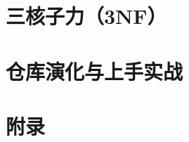 \documentclass[11pt, a4paper, oneside, openany]{book}
\begin{document}
\part{三核子力（3NF）}




\part{仓库演化与上手实战}




\appendix
\part{附录}







\backmatter
\printbibliography[heading=bibintoc]
\end{document}

